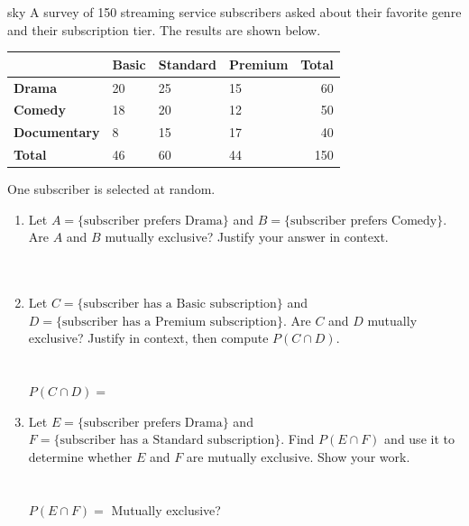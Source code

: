 \documentclass[10pt]{article}
\begin{document}
\namedateperiod

\vspace{0.14in}

\begin{scenariobox}[Context]{sky}
\small
A survey of 150 streaming service subscribers asked about their favorite genre and
their subscription tier. The results are shown below.

\vspace{6pt}
\renewcommand{\arraystretch}{1.4}
\begin{tabularx}{\linewidth}{@{} l X X X r @{}}
 & \textbf{Basic} & \textbf{Standard} & \textbf{Premium} & \textbf{Total} \\
\hline
\textbf{Drama}   & 20 & 25 & 15 & 60 \\
\textbf{Comedy}  & 18 & 20 & 12 & 50 \\
\textbf{Documentary} & 8 & 15 & 17 & 40 \\
\hline
\textbf{Total}   & 46 & 60 & 44 & 150 \\
\end{tabularx}

\vspace{4pt}
One subscriber is selected at random.
\end{scenariobox}

\vspace{0.1in}

\begin{practicebox}
\small
\begin{enumerate}[leftmargin=1.5em, itemsep=12pt]
  \item Let $A = \{\text{subscriber prefers Drama}\}$ and $B = \{\text{subscriber prefers Comedy}\}$.
        Are $A$ and $B$ mutually exclusive? Justify your answer in context.\\
        \writeline\\[1pt]\writeline\\[1pt]\writeline

  \item Let $C = \{\text{subscriber has a Basic subscription}\}$ and
        $D = \{\text{subscriber has a Premium subscription}\}$.
        Are $C$ and $D$ mutually exclusive? Justify in context, then compute $P(C \cap D)$.\\
        \writeline\\[1pt]\writeline\\[1pt]
        $P(C \cap D) = $ \blank{4cm}

  \item Let $E = \{\text{subscriber prefers Drama}\}$ and
        $F = \{\text{subscriber has a Standard subscription}\}$.
        Find $P(E \cap F)$ and use it to determine whether $E$ and $F$ are mutually exclusive.
        Show your work.\\
        \writeline\\[1pt]\writeline\\[1pt]
        $P(E \cap F) = $ \blank{3cm} \quad Mutually exclusive? \blank{2cm}
\end{enumerate}
\end{practicebox}
\end{document}
